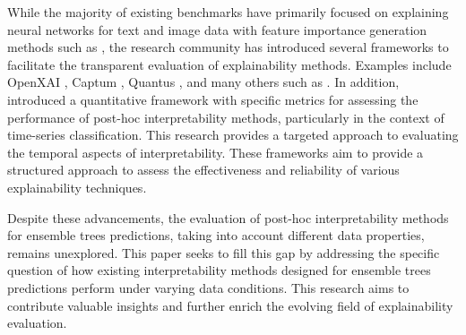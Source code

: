 While the majority of existing benchmarks have primarily focused on explaining neural networks for text and image data with feature importance generation methods such as \cite{ismailBenchmarkingDeepLearning2020, attanasioFerretFrameworkBenchmarking2022, bodriaBenchmarkingSurveyExplanation2021, yang2019benchmarking, zhong2023clock, han2022explanation}, %
the research community has introduced several frameworks to facilitate the transparent evaluation of explainability methods. Examples include OpenXAI \cite{agarwalOpenXAITransparentEvaluation}, Captum \cite{kokhlikyanCaptumUnifiedGeneric2020}, Quantus \cite{hedstromQuantusExplainableAI2022}, and many others such as \cite{guidotti2021evaluating, le2023benchmarking}.
In addition, \cite{turbe2023evaluation} introduced a quantitative framework with specific metrics for assessing the performance of post-hoc interpretability methods, particularly in the context of time-series classification. This research provides a targeted approach to evaluating the temporal aspects of interpretability.
These frameworks aim to provide a structured approach to assess the effectiveness and reliability of various explainability techniques. 

Despite these advancements, the evaluation of post-hoc interpretability methods for ensemble trees predictions, taking into account different data properties, remains unexplored. This paper seeks to fill this gap by addressing the specific question of how existing interpretability methods designed for ensemble trees predictions perform under varying data conditions. This research aims to contribute valuable insights and further enrich the evolving field of explainability evaluation.
